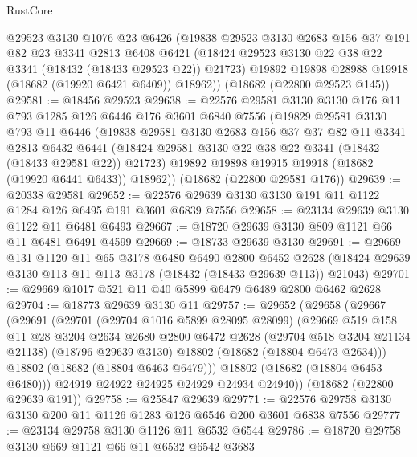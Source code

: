 \begin{lexlean}{RustCore}
\begin{coremodule}
      @29523
      @3130
      @1076
      @23
      @6426
      (@19838
        @29523
        @3130
        @2683
        @156
        @37
        @191
        @82
        @23
        @3341
        @2813
        @6408
        @6421
        (@18424 @29523 @3130 @22 @38 @22 @3341 (@18432 (@18433 @29523 @22)) @21723)
        @19892
        @19898
        @28988
        @19918
        (@18682 (@19920 @6421 @6409))
        @18962))
    (@18682 (@22800 @29523 @145))
@29581 := @18456 @29523
@29638 := @22576
    @29581
    @3130
    @3130
    @176
    @11
    @793
    @1285
    @126
    @6446
    @176
    @3601
    @6840
    @7556
    (@19829
      @29581
      @3130
      @793
      @11
      @6446
      (@19838
        @29581
        @3130
        @2683
        @156
        @37
        @37
        @82
        @11
        @3341
        @2813
        @6432
        @6441
        (@18424 @29581 @3130 @22 @38 @22 @3341 (@18432 (@18433 @29581 @22)) @21723)
        @19892
        @19898
        @19915
        @19918
        (@18682 (@19920 @6441 @6433))
        @18962))
    (@18682 (@22800 @29581 @176))
@29639 := @20338 @29581
@29652 := @22576 @29639 @3130 @3130 @191 @11 @1122 @1284 @126 @6495 @191 @3601 @6839 @7556
@29658 := @23134 @29639 @3130 @1122 @11 @6481 @6493
@29667 := @18720 @29639 @3130 @809 @1121 @66 @11 @6481 @6491 @4599
@29669 := @18733 @29639 @3130
@29691 := @29669
    @131
    @1120
    @11
    @65
    @3178
    @6480
    @6490
    @2800
    @6452
    @2628
    (@18424 @29639 @3130 @113 @11 @113 @3178 (@18432 (@18433 @29639 @113)) @21043)
@29701 := @29669 @1017 @521 @11 @40 @5899 @6479 @6489 @2800 @6462 @2628
@29704 := @18773 @29639 @3130 @11
@29757 := @29652
    (@29658
      (@29667
        (@29691
          (@29701
            (@29704 @1016 @5899 @28095 @28099)
            (@29669
              @519
              @158
              @11
              @28
              @3204
              @2634
              @2680
              @2800
              @6472
              @2628
              (@29704 @518 @3204 @21134 @21138)
              (@18796 @29639 @3130)
              @18802
              (@18682 (@18804 @6473 @2634)))
            @18802
            (@18682 (@18804 @6463 @6479)))
          @18802
          (@18682 (@18804 @6453 @6480)))
        @24919
        @24922
        @24925
        @24929
        @24934
        @24940))
    (@18682 (@22800 @29639 @191))
@29758 := @25847 @29639
@29771 := @22576 @29758 @3130 @3130 @200 @11 @1126 @1283 @126 @6546 @200 @3601 @6838 @7556
@29777 := @23134 @29758 @3130 @1126 @11 @6532 @6544
@29786 := @18720 @29758 @3130 @669 @1121 @66 @11 @6532 @6542 @3683

\end{coremodule}
\end{lexlean}
